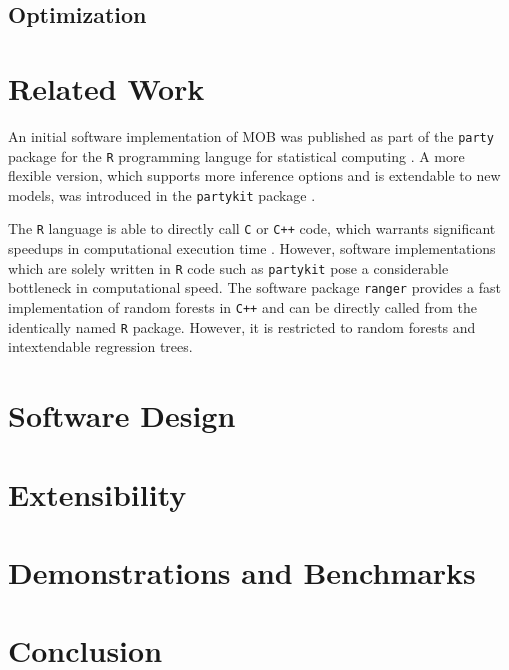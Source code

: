 \documentclass[a4paper, 11pt]{article}
\begin{document}
\subsection{Optimization}


\section{Related Work}

An initial software implementation of MOB was published as part of the \texttt{party} package \cite{party_package} for the \texttt{R} programming languge for statistical computing \cite{r_citation}. A more flexible version, which supports more inference options and is extendable to new models, was introduced in the \texttt{partykit} package \cite{partykit_package}. 
\par
The \texttt{R} language is able to directly call \texttt{C} or \texttt{C++} code, which warrants significant speedups in computational execution time \cite{eddelbuettel_rcpp}. However, software implementations which are solely written in \texttt{R} code such as \texttt{partykit} pose a considerable bottleneck in computational speed.
The software package \texttt{ranger} \cite{ranger_package} provides a fast implementation of random forests in \texttt{C++} and can be directly called from the identically named \texttt{R} package. However, it is restricted to random forests and intextendable regression trees.


\section{Software Design}

\section{Extensibility}

\section{Demonstrations and Benchmarks}

\section{Conclusion}


\end{document}
